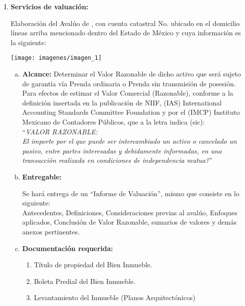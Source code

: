 \begin{enumerate}[I.]
\item \textbf{Servicios de valuaci\'on:}

Elaboraci\'on del Aval\'uo de \tipoValuacion, con cuenta catastral No. \cuentaCatastral  ubicado en  el domicilio l\'ineas arriba mencionado dentro del Estado de M\'exico y cuya informaci\'on es la siguiente:
\begin{center}
\texttt{[image: imagenes/imagen\_1]}
\end{center}

\begin{enumerate}[a)]
\item \textbf{Alcance:}
Determinar el Valor Razonable de dicho activo que ser\'a sujeto de garant\'ia v\'ia Prenda ordinaria o  Prenda sin transmisi\'on de posesi\'on.\\[10pt]

Para efectos de estimar el Valor Comercial (Razonable), conforme a la definici\'on insertada en la  publicaci\'on de NIIF, (IAS) International Accounting Standards Committee Foundation y por el  (IMCP) Instituto Mexicano de Contadores P\'ublicos, que a la letra indica (sic):\\

``\textit{VALOR RAZONABLE:}\\	
\textit{El importe por el que puede  ser intercambiado un activo o cancelado un pasivo, entre partes interesadas y debidamente informadas, en una transacci\'on realizada en condiciones de independencia mutua?}''
\\

\item \textbf{Entregable:}

Se har\'a entrega de un ``Informe de Valuaci\'on'', mismo que consiste en lo siguiente:\\

Antecedentes, Definiciones, Consideraciones previas al aval\'uo, Enfoques aplicados, Conclusi\'on de Valor Razonable, sumarios de valores y dem\'as anexos pertinentes.
\\

\item \textbf{Documentaci\'on requerida:}
	\begin{enumerate}[1.-]
	\item  T\'itulo de propiedad del Bien Inmueble.                  
	\item Boleta Predial del Bien Inmueble.
	\item Levantamiento del Inmueble (Planos Arquitect\'onicos)
	\end{enumerate}


\end{enumerate}
\end{enumerate}
